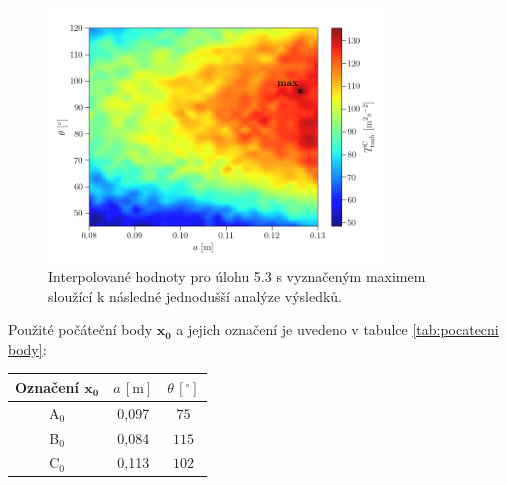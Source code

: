 \begin{figure}[H]
	\centering
	\vspace{-15mm}
	\includegraphics[width=0.8\textwidth]{Images/cassini2Dinterpolated.png}
	\caption{Interpolované hodnoty pro úlohu 5.3 s vyznačeným maximem sloužící k následné jednodušší analýze výsledků.}
	\label{fig:interpolovany cassini}
\end{figure}

Použité počáteční body $\mathbf{x_0}$ a jejich označení je uvedeno v tabulce \ref{tab:pocatecni body}:

\begin{center}
	
\bgroup
\setlength\tabcolsep{3mm}
\def\arraystretch{1.6}%
\begin{tabular}{ccc}
	\hline 
	Označení $\mathbf{x_0}$  & $ a \, [\text{m}]$ & $ \theta \, [^{\circ}] $\\
	\hline
	A$_0$ & 0{,}097 & $ 75 $ \\
	B$_0$ & 0{,}084 & $ 115 $ \\
	C$_0$ & 0{,}113 & $ 102 $\\
	\hline

\end{tabular}
\vspace{1mm}
\label{tab:pocatecni body}
\egroup
\end{center}

